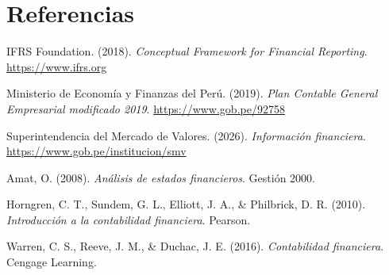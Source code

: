 \section{Referencias}
\begingroup
\sloppy
IFRS Foundation. (2018). \textit{Conceptual Framework for Financial Reporting}. \href{https://www.ifrs.org/issued-standards/list-of-standards/conceptual-framework/}{https://www.ifrs.org}

Ministerio de Economía y Finanzas del Perú. (2019). \textit{Plan Contable General Empresarial modificado 2019}. \href{https://www.gob.pe/92758-ministerio-de-economia-y-finanzas-pcge}{https://www.gob.pe/92758}

Superintendencia del Mercado de Valores. (2026). \textit{Información financiera}. \href{https://www.gob.pe/institucion/smv/tema/informacion-financiera}{https://www.gob.pe/institucion/smv}

Amat, O. (2008). \textit{Análisis de estados financieros}. Gestión 2000.

Horngren, C. T., Sundem, G. L., Elliott, J. A., \& Philbrick, D. R. (2010). \textit{Introducción a la contabilidad financiera}. Pearson.

Warren, C. S., Reeve, J. M., \& Duchac, J. E. (2016). \textit{Contabilidad financiera}. Cengage Learning.
\endgroup

